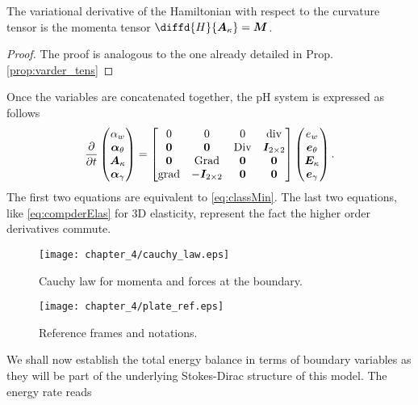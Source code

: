 \begin{proposition}
	The variational derivative of the Hamiltonian with respect to the curvature tensor is the momenta tensor $\diffd{H}{\bm{A}_{\kappa}} = \bm{M}$.
	\begin{proof}
		The proof is analogous to the one already detailed in Prop. \ref{prop:varder_tens}
	\end{proof}
\end{proposition}

Once the variables are concatenated together, the pH system is expressed as follows
\begin{equation}
\diffp{}{t}
\begin{pmatrix}
\alpha_w \\
\bm\alpha_\theta \\
\bm{A}_\kappa \\
\bm\alpha_{\gamma} \\
\end{pmatrix} = 
\begin{bmatrix}
0  & 0  & 0  & \div \\
\bm{0} & \bm{0} &  \Div & \bm{I}_{2 \times 2}\\
\bm{0}  & \Grad  & \bm{0}  & \bm{0}\\
\grad & -\bm{I}_{2 \times 2} &  \bm{0} & \bm{0} \\
\end{bmatrix}
\begin{pmatrix}
e_w \\
\bm{e}_{\theta} \\
\bm{E}_{\kappa} \\
\bm{e}_{\gamma} \\
\end{pmatrix}.
\end{equation}
The first two equations are equivalent to \eqref{eq:classMin}. The last two equations, like \eqref{eq:compderElas} for 3D elasticity, represent the fact the higher order derivatives commute.
\begin{figure}[t]
	\centering
	\texttt{[image: chapter\_4/cauchy\_law.eps]}
	\caption{Cauchy law for momenta and forces at the boundary.}
	\label{fig:Cauchy_law}
\end{figure}
\begin{figure}[tb]
	\centering
	\texttt{[image: chapter\_4/plate\_ref.eps]}
	\caption{Reference frames and notations.}
	\label{fig:plate_ref}
\end{figure}
We shall now establish the total energy balance in terms of boundary variables as they will  be part of the underlying Stokes-Dirac structure of this model. The energy rate reads
